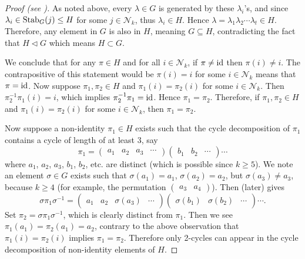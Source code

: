 \begin{proof}[Proof (see {\cite[Theorem 4.24]{dummit_foote_2004}})]
    As noted above, every $\lambda \in G$ is generated by these $\lambda_i$'s, and since $\lambda_i \in \mathrm{Stab}_{G}(j) \leq H$ for some $j \in \mathcal{N}_{k}$, thus $\lambda_i \in H$. Hence $\lambda = \lambda_1\lambda_2\cdots\lambda_t \in H$. Therefore, any element in $G$ is also in $H$, meaning $G \subseteq H$, contradicting the fact that $H \lhd G$ which means $H \subset G$.
    
    We conclude that for any $\pi \in H$ and for all $i \in \mathcal{N}_k$, if $\pi \neq \mathrm{id}$ then $\pi(i) \neq i$. The contrapositive of this statement would be $\pi(i) = i$ for some $i \in \mathcal{N}_k$ means that $\pi = \mathrm{id}$. Now suppose $\pi_1, \pi_2 \in H$ and $\pi_1(i) = \pi_2(i)$ for some $i \in \mathcal{N}_{k}$. Then $\pi_2^{-1}\pi_1(i) = i$, which implies $\pi_2^{-1}\pi_1 = \mathrm{id}$. Hence $\pi_1 = \pi_2$. Therefore, if $\pi_1, \pi_2 \in H$ and $\pi_1(i) = \pi_2(i)$ for some $i \in \mathcal{N}_{k}$, then $\pi_1 = \pi_2$.

    Now suppose a non-identity $\pi_1 \in H$ exists such that the cycle decomposition of $\pi_1$ contains a cycle of length of at least 3, say
    \[
        \pi_1 = \begin{pmatrix}a_1&a_2&a_3&\cdots\end{pmatrix} \begin{pmatrix}b_1&b_2&\cdots\end{pmatrix}\cdots
    \]
    where $a_1$, $a_2$, $a_3$, $b_1$, $b_2$, etc. are distinct (which is possible since $k \geq 5$). We note an element $\sigma \in G$ exists such that $\sigma(a_1) = a_1$, $\sigma(a_2) = a_2$, but $\sigma(a_3) \neq a_3$, because $k \geq 4$ (for example, the permutation $\begin{pmatrix}a_3 & a_4\end{pmatrix}$). Then  (later) gives
    \[
        \sigma\pi_1\sigma^{-1} = \begin{pmatrix}a_1&a_2&\sigma(a_3)&\cdots\end{pmatrix} \begin{pmatrix}\sigma(b_1)&\sigma(b_2)&\cdots\end{pmatrix}\cdots.
    \]
    Set $\pi_2 = \sigma\pi_1\sigma^{-1}$, which is clearly distinct from $\pi_1$. Then we see $\pi_1(a_1) = \pi_2(a_1) = a_2$, contrary to the above observation that $\pi_1(i) = \pi_2(i)$ implies $\pi_1 = \pi_2$. Therefore only 2-cycles can appear in the cycle decomposition of non-identity elements of $H$.


\end{proof}
